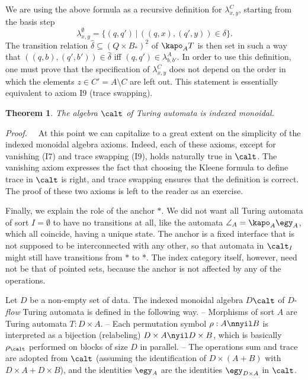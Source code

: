 \documentclass{eptcs}
\newtheorem{theorem}{Theorem}
\begin{document}
We are using the above formula as a recursive definition for $\lambda _{x,y}^C$, starting
from the basis step 
\[ \lambda _{x,y}^{\emptyset }=\{ (q,q')\,|\,((q,x),(q',y))\in \delta \}.\]
The transition relation $\hat {\delta }\subseteq (Q\times B_*)^2$ of $\kapo _A T$ is then set 
in such a way that $((q,b),(q',b'))\in \hat {\delta }$ iff $(q,q')\in \lambda _{b,b'}^A$.
In order to use this definition, one must prove that the specification of
$\lambda _{x,y}^C$ does not depend on the order in which the elements $z\in C'=A\setminus C$
are left out. This statement is essentially equivalent to axiom I9 (trace swapping).
\begin{theorem}
The algebra $\calt $ of Turing automata is indexed monoidal.
\end{theorem}
{\em Proof.\ \ }
At this point we can capitalize to a great extent on the simplicity of the indexed
monoidal algebra axioms. Indeed, each of these axioms, except for vanishing (I7)
and trace swapping (I9), holds naturally true in $\calt $. The vanishing axiom
expresses the fact that choosing the Kleene formula to define trace in $\calt $
is right, and trace
swapping ensures that the definition is correct. The proof of these two axioms
is left to the reader as an exercise. 
\vege


Finally, we explain the role of the anchor $*$. We did not want all Turing automata
of sort $I=\emptyset $ to have no transitions at all, like the automata $\angle _A=
\kapo _A \egy _A$, which all coincide, having a unique state. The
anchor is a fixed interface that is not supposed to be interconnected with any
other, so that automata in $\calt _I$ might still have transitions from $*$ to $*$.
The index category itself, however, need not be
that of pointed sets, because the anchor is not affected by any of the operations.

Let $D$ be a non-empty set of data. The indexed monoidal algebra $D$\dil $\calt $ of
$D$-{\em flow\/} Turing automata is defined in the following way.
\vsp\newline
-- Morphisms of sort $A$ are Turing automata $T:D\times A$.
\newline
-- Each permutation symbol $\rho :A\nnyil B$ is interpreted as a bijection (relabeling)
$D\times A\nyil D\times B$, which is basically $\rho _{\calt }$ performed on blocks
of size $D$ in parallel.
\newline
-- The operations sum and trace are adopted from $\calt $ (assuming the identification
of $D\times (A+B)$ with $D\times A+D\times B$), and
the identities $\egy _A$ are the identities $\egy _{D\times A}$ in $\calt $.
\vsp
\end{document}
